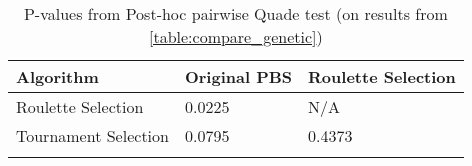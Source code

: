 \begin{table}[H]
    \centering
    \caption{P-values from Post-hoc pairwise Quade test (on results from \cref{table:compare_genetic})}\label{table:compare_genetic_quade}
    \begin{tabularx}{0.75\textwidth}{|X|XX|}
        \hline
        \textbf{Algorithm} & Original PBS & Roulette Selection\\
        \hline
        Roulette Selection & 0.0225 & N/A\\
        Tournament Selection & 0.0795 & 0.4373\\
        \lasthline
    \end{tabularx}
\end{table}
